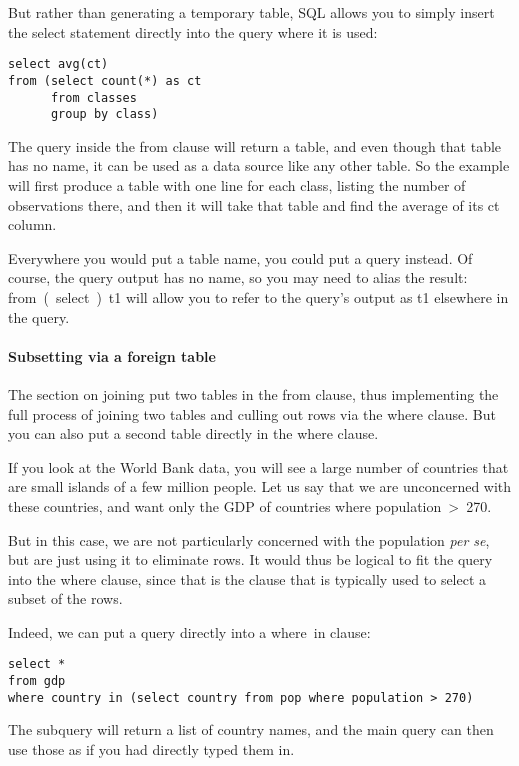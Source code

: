 But rather than generating a temporary table, SQL allows you to simply
insert the \si{select} statement directly into the query where it is
used:
\begin{lstlisting}
select avg(ct) 
from (select count(*) as ct
      from classes
      group by class)
\end{lstlisting}
The query inside the \si{from} clause will return a table, and even
though that table has no name, it can be used as a data source like any other
table. So the example will first produce a table with one line for each
class, listing the number of observations there, and then it will
take that table and find the average of its \si{ct} column.

Everywhere you would put a table name, you could put a query 
instead. Of course, the query output has no name, so you may need to
alias the result: \si{from (select ...) t1} will allow you to refer to
the query's output as \si{t1} elsewhere in the query.


\paragraph{Subsetting via a foreign table} The section on joining
put two tables in the \si{from} clause, thus implementing the full
process of joining two tables and culling out rows via the \si{where}
clause. But you can also put a second table directly in the \si{where}
clause.

If you look at the World Bank data, you will see a large number of
countries that are small islands of a few million people. Let us say
that we are unconcerned with these countries, and want only the GDP of
countries where \si{population > 270}.


But in this case, we are not particularly concerned with the population
{\it per se}, but are just using it to eliminate rows. It would thus be
logical to fit the query into the \si{where} clause, since that is the
clause that is typically used to select a subset of the rows. 

Indeed, we can put a query directly into a \si{where ... in} clause:
\begin{lstlisting}
select * 
from gdp
where country in (select country from pop where population > 270)
\end{lstlisting}
The  subquery will return a list of country names, and the main query
can then use those as if you had directly typed them in.

